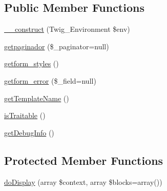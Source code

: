 \subsection*{Public Member Functions}
\begin{DoxyCompactItemize}
\item 
\hyperlink{class_____twig_template__e0265d0d242339c17c07a02d9cb58804_a4f8326243132c1450a81e0a817aa1be7}{\-\_\-\-\_\-construct} (Twig\-\_\-\-Environment \$env)
\item 
\hyperlink{class_____twig_template__e0265d0d242339c17c07a02d9cb58804_a8458b3f7d98f517b77da23f7d81be90e}{getpaginador} (\$\-\_\-paginator=null)
\item 
\hyperlink{class_____twig_template__e0265d0d242339c17c07a02d9cb58804_a2e4dff64daaf5a11c1885daf38153a1d}{getform\-\_\-styles} ()
\item 
\hyperlink{class_____twig_template__e0265d0d242339c17c07a02d9cb58804_ad78f74b7f139f15593d0a5348e9cef76}{getform\-\_\-error} (\$\-\_\-field=null)
\item 
\hyperlink{class_____twig_template__e0265d0d242339c17c07a02d9cb58804_a621a3ccd148ed8b9e937da6959c98f39}{get\-Template\-Name} ()
\item 
\hyperlink{class_____twig_template__e0265d0d242339c17c07a02d9cb58804_aa9eb89be270f6afc256ef5e272b78a63}{is\-Traitable} ()
\item 
\hyperlink{class_____twig_template__e0265d0d242339c17c07a02d9cb58804_abd0ecb0136f4228db2bd963bfc1e20d7}{get\-Debug\-Info} ()
\end{DoxyCompactItemize}
\subsection*{Protected Member Functions}
\begin{DoxyCompactItemize}
\item 
\hyperlink{class_____twig_template__e0265d0d242339c17c07a02d9cb58804_adb62b7c226e07d30f836ed16158d924f}{do\-Display} (array \$context, array \$blocks=array())
\end{DoxyCompactItemize}


